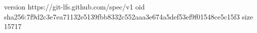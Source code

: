 version https://git-lfs.github.com/spec/v1
oid sha256:7f9d2c3e7ea71132e5139fbb8332c552aaa3e674a5def53ef9f01548ce5c15f3
size 15717
